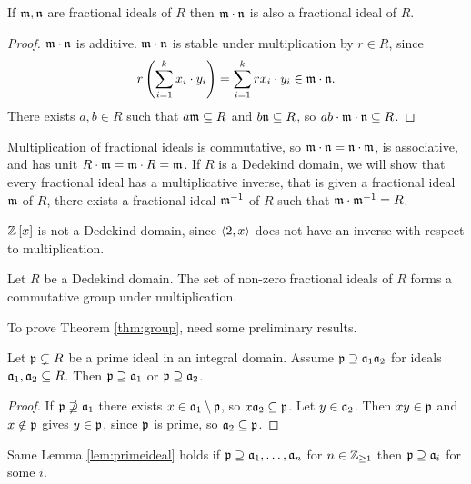 \begin{lemma}
If $ \mm, \nn $ are fractional ideals of $ R $ then $ \mm \cdot \nn $ is also a fractional ideal of $ R $.
\end{lemma}

\begin{proof}
$ \mm \cdot \nn $ is additive. $ \mm \cdot \nn $ is stable under multiplication by $ r \in R $, since
$$ r\rb{\sum_{i = 1}^k x_i \cdot y_i} = \sum_{i = 1}^k rx_i \cdot y_i \in \mm \cdot \nn. $$
There exists $ a, b \in R $ such that $ a\mm \subseteq R $ and $ b\nn \subseteq R $, so $ ab \cdot \mm \cdot \nn \subseteq R $.
\end{proof}

Multiplication of fractional ideals is commutative, so $ \mm \cdot \nn = \nn \cdot \mm $, is associative, and has unit $ R \cdot \mm = \mm \cdot R = \mm $. If $ R $ is a Dedekind domain, we will show that every fractional ideal has a multiplicative inverse, that is given a fractional ideal $ \mm $ of $ R $, there exists a fractional ideal $ \mm^{-1} $ of $ R $ such that $ \mm \cdot \mm^{-1} = R $.

\begin{example*}
$ \Z\sb{x} $ is not a Dedekind domain, since $ \ab{2, x} $ does not have an inverse with respect to multiplication.
\end{example*}

\begin{theorem}
\label{thm:group}
Let $ R $ be a Dedekind domain. The set of non-zero fractional ideals of $ R $ forms a commutative group under multiplication.
\end{theorem}

To prove Theorem \ref{thm:group}, need some preliminary results.

\begin{lemma}
\label{lem:primeideal}
Let $ \pp \subsetneq R $ be a prime ideal in an integral domain. Assume $ \pp \supseteq \aa_1\aa_2 $ for ideals $ \aa_1, \aa_2 \subseteq R $. Then $ \pp \supseteq \aa_1 $ or $ \pp \supseteq \aa_2 $.
\end{lemma}

\begin{proof}
If $ \pp \nsupseteq \aa_1 $ there exists $ x \in \aa_1 \setminus \pp $, so $ x\aa_2 \subseteq \pp $. Let $ y \in \aa_2 $. Then $ xy \in \pp $ and $ x \notin \pp $ gives $ y \in \pp $, since $ \pp $ is prime, so $ \aa_2 \subseteq \pp $.
\end{proof}

\begin{remark*}
Same Lemma \ref{lem:primeideal} holds if $ \pp \supseteq \aa_1, \dots, \aa_n $ for $ n \in \Z_{\ge 1} $ then $ \pp \supseteq \aa_i $ for some $ i $.
\end{remark*}

